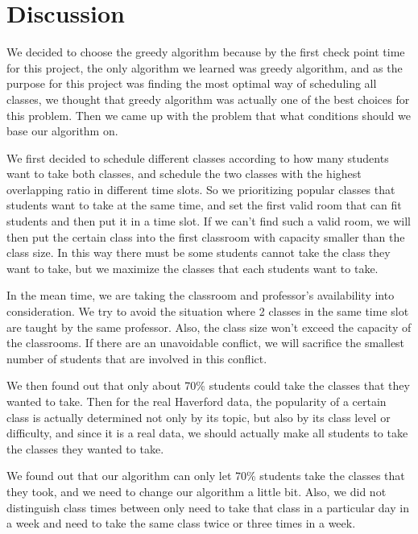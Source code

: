 \documentclass[11pt, oneside]{article}   	%
\begin{document}

\section{Discussion}
We decided to choose the greedy algorithm because by the first check point time for this project, the only algorithm we learned was greedy algorithm, and as the purpose for this project was finding the most optimal way of scheduling all classes, we thought that greedy algorithm was actually one of the best choices for this problem. Then we came up with the problem that what conditions should we base our algorithm on.

We first decided to schedule different classes according to how many students want to take both classes, and schedule the two classes with the highest overlapping ratio in different time slots. So we prioritizing popular classes that students want to take at the same time, and set the first valid room that can fit students and then put it in a time slot. If we can't find such a valid room, we will then put the certain class into the first classroom with capacity smaller than the class size. In this way there must be some students cannot take the class they want to take, but we maximize the classes that each students want to take.

In the mean time, we are taking the classroom and professor's availability into consideration. We try to avoid the situation where 2 classes in the same time slot are taught by the same professor. Also, the class size won't exceed the capacity of the classrooms. If there are an unavoidable conflict, we will sacrifice the smallest number of students that are involved in this conflict.

We then found out that only about 70\% students could take the classes that they wanted to take. Then for the real Haverford data, the popularity of a certain class is actually determined not only by its topic, but also by its class level or difficulty, and since it is a real data, we should actually make all students to take the classes they wanted to take. 

We found out that our algorithm can only let 70\% students take the classes that they took, and we need to change our algorithm a little bit. Also, we did not distinguish class times between only need to take that class in a particular day in a week and need to take the same class twice or three times in a week. 
\end{document}
